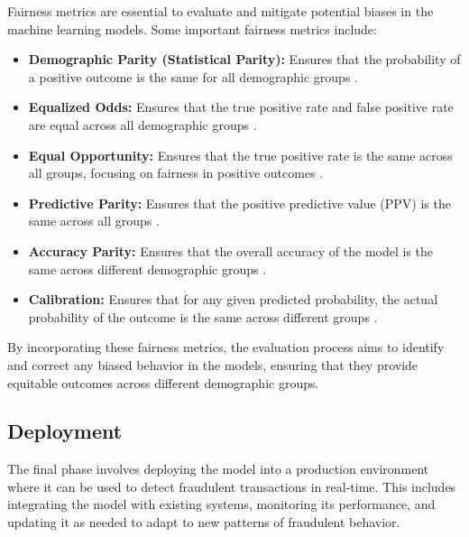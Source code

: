 \documentclass[12pt,a4paper]{report}
\begin{document}
Fairness metrics are essential to evaluate and mitigate potential biases in the machine learning models. Some important fairness metrics include:

\begin{itemize}
    \item \textbf{Demographic Parity (Statistical Parity):} Ensures that the probability of a positive outcome is the same for all demographic groups \citep{barocas2023fairness}.
    \item \textbf{Equalized Odds:} Ensures that the true positive rate and false positive rate are equal across all demographic groups \citep{barocas2023fairness}.
    \item \textbf{Equal Opportunity:} Ensures that the true positive rate is the same across all groups, focusing on fairness in positive outcomes \citep{barocas2023fairness}.
    \item \textbf{Predictive Parity:} Ensures that the positive predictive value (PPV) is the same across all groups \citep{barocas2023fairness}.
    \item \textbf{Accuracy Parity:} Ensures that the overall accuracy of the model is the same across different demographic groups \citep{barocas2023fairness}.
    \item \textbf{Calibration:} Ensures that for any given predicted probability, the actual probability of the outcome is the same across different groups \citep{mehrabi2021survey}.
\end{itemize}

By incorporating these fairness metrics, the evaluation process aims to identify and correct any biased behavior in the models, ensuring that they provide equitable outcomes across different demographic groups.\\




\subsection{Deployment}
The final phase involves deploying the model into a production environment where it can be used to detect fraudulent transactions in real-time. This includes integrating the model with existing systems, monitoring its performance, and updating it as needed to adapt to new patterns of fraudulent behavior.







\clearpage
\end{document}
